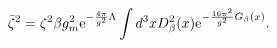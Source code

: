 \begin{equation}
\bar\zeta^2= \zeta^2\beta g_m^2 {\rm e}^{-{4\pi\over
g^2}\Lambda}\int d^3x D_\beta^2(x){\rm e}^{-{16\pi^2\over g^2}
G_\beta(x)}.
\end{equation} 
